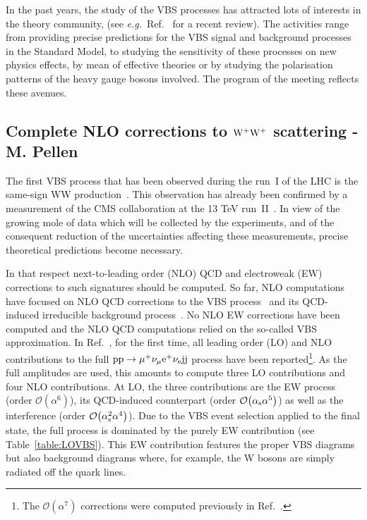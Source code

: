 In the past years, the study of the VBS processes has attracted lots of interests in the theory community, (see \emph{e.g.}\ Ref.~\cite{Rauch:2016pai} for 
a recent review).
The activities range from providing precise predictions for the VBS signal and background processes in the Standard Model, to studying the sensitivity of these 
processes on new physics effects, by mean of effective theories or by studying the polarisation patterns of the heavy gauge bosons involved.
The program of the meeting reflects these avenues.

\subsection{Complete NLO corrections to ${\rm W^+ W^+}$ scattering - M. Pellen}

The first VBS process that has been observed during the run~I of the LHC is the same-sign WW production~\cite{Aad:2014zda,Aaboud:2016ffv,Khachatryan:2014sta}.
This observation has already been confirmed by a measurement of the CMS collaboration at the 13 TeV run~II~\cite{CMS:2017adb}.
In view of the growing mole of data which will be collected by the experiments, and of the consequent reduction of the uncertainties affecting these measurements, precise theoretical predictions become necessary.

In that respect next-to-leading order (NLO) QCD and electroweak (EW) corrections to such signatures should be computed.
So far, NLO computations have focused on NLO QCD corrections to the VBS process~\cite{Jager:2009xx,Jager:2011ms,Denner:2012dz,Rauch:2016pai} and its QCD-induced irreducible background process~\cite{Melia:2010bm,Melia:2011gk,Campanario:2013gea,Baglio:2014uba,Rauch:2016pai}.
No NLO EW corrections have been computed and the NLO QCD computations relied on the so-called VBS approximation.
In Ref.~\cite{Biedermann:2017bss}, for the first time, all leading order (LO) and NLO contributions to the full ${\rm p}{\rm p}\to\mu^+\nu_\mu{\rm e}^+\nu_{\rm e}{\rm j}{\rm j}$ process have been reported\footnote{The $\mathcal{O}{\left(\alpha^{7}\right)}$ corrections
were computed previously in Ref.~\cite{Biedermann:2016yds}.}.
As the full amplitudes are used, this amounts to compute three LO contributions and four NLO contributions.
At LO, the three contributions are the EW process (order $\mathcal{O}{\left(\alpha^{6}\right)}$), its QCD-induced counterpart (order $\mathcal{O}{\left(\alpha_{\rm s}\alpha^{5}\right)}$) as well as the interference (order $\mathcal{O}{\left(\alpha_{\rm s}^2\alpha^{4}\right)}$).
Due to the VBS event selection applied to the final state, the full process is dominated by the purely EW contribution (see Table~\ref{table:LOVBS}).
This EW contribution features the proper VBS diagrams but also background diagrams where, for example, the W bosons are simply radiated off the quark lines.

